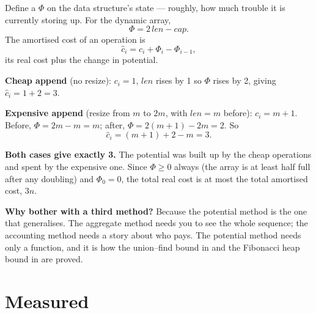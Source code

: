 \begin{conceptbox}
Define a  $\Phi$ on the data structure's state ---
roughly, how much trouble it is currently storing up. For the dynamic array,
\[ \Phi = 2\,\mathit{len} - \mathit{cap}. \]
The amortised cost of an operation is
\[ \hat{c}_{i} = c_{i} + \Phi_{i} - \Phi_{i-1}, \]
its real cost plus the change in potential.

\smallskip
\textbf{Cheap append} (no resize): $c_{i} = 1$, $\mathit{len}$ rises by 1 so
$\Phi$ rises by 2, giving $\hat{c}_{i} = 1 + 2 = 3$.

\smallskip
\textbf{Expensive append} (resize from $m$ to $2m$, with $\mathit{len} = m$
before): $c_{i} = m + 1$. Before, $\Phi = 2m - m = m$; after,
$\Phi = 2(m+1) - 2m = 2$. So
\[ \hat{c}_{i} = (m+1) + 2 - m = 3. \]

\smallskip
\textbf{Both cases give exactly 3.} The potential was built up by the cheap
operations and spent by the expensive one. Since $\Phi \ge 0$ always (the array
is at least half full after any doubling) and $\Phi_{0} = 0$, the total real
cost is at most the total amortised cost, $3n$.

\smallskip
\textbf{Why bother with a third method?} Because the potential method is the
one that generalises. The aggregate method needs you to see the whole sequence;
the accounting method needs a story about who pays. The potential method needs
only a function, and it is how the union--find bound in  and the
Fibonacci heap bound in  are proved.
\end{conceptbox}

\section{Measured}

